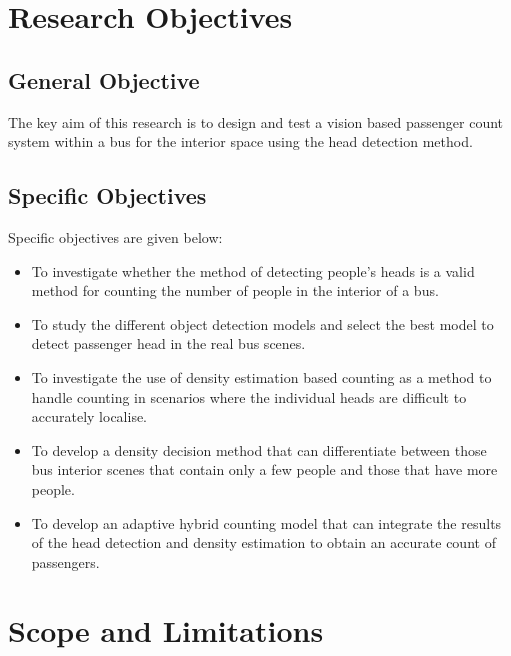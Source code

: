 \section{Research Objectives}

\subsection{General Objective}

The key aim of this research is to design and test a vision based passenger count system within a bus for the interior space using the head detection method.

\subsection{Specific Objectives}

Specific objectives are given below:

\begin{itemize}

    \item To investigate whether the method of detecting people's heads is a valid method for counting the number of people in the interior of a bus.
    
    \item To study the different object detection models and select the best model to detect passenger head in the real bus scenes.
    
    \item To investigate the use of density estimation based counting as a method to handle counting in scenarios where the individual heads are difficult to accurately localise.
    
    \item To develop a density decision method that can differentiate between those bus interior scenes that contain only a few people and those that have more people.
    
    \item To develop an adaptive hybrid counting model that can integrate the results of the head detection and density estimation to obtain an accurate count of passengers.
    
\end{itemize}


\section{Scope and Limitations}

